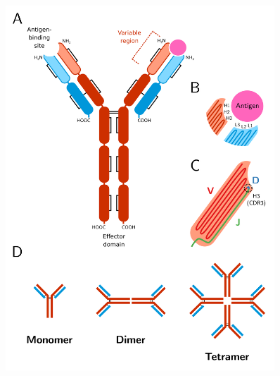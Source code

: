 \begin{figure}
\centering
\includegraphics[width=0.9\textwidth]{_Figures/png_edited/antibody-structure}
\begin{subfigure}{0em}
\label{fig:intro-antibody-structure-schematic}
\end{subfigure}
\begin{subfigure}{0em}
\label{fig:intro-antibody-structure-loops}
\end{subfigure}
\begin{subfigure}{0em}
\label{fig:intro-antibody-structure-vdj}
\end{subfigure}
\begin{subfigure}{0em}
\label{fig:intro-antibody-structure-multimers}
\end{subfigure}

\end{figure}
